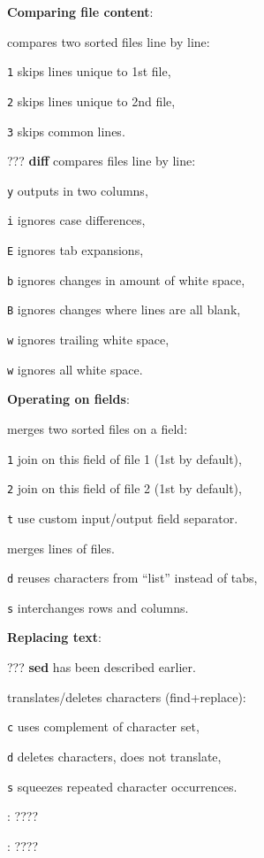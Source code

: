 \textbf{Comparing file content}:
\begin{compactenum}
	\item [\symbolcoreutils]  compares two sorted files line by line:
	\item [\texttt{1}] skips lines unique to 1st file,
	\item [\texttt{2}] skips lines unique to 2nd file,
	\item [\texttt{3}] skips common lines.

	\item [???] \textbf{diff} compares files line by line:
	\item [\texttt{y}] outputs in two columns,
	\item [\texttt{i}] ignores case differences,
	\item [\texttt{E}] ignores tab expansions,
	\item [\texttt{b}] ignores changes in amount of white space,
	\item [\texttt{B}] ignores changes where lines are all blank,
	\item [\texttt{w}] ignores trailing white space,
	\item [\texttt{w}] ignores all white space.
\end{compactenum}

\textbf{Operating on fields}:
\begin{compactenum}
	\item [\symbolcoreutils]  merges two sorted files on a field:
	\item [\texttt{1}] join on this field of file 1 (1st by default),
	\item [\texttt{2}] join on this field of file 2 (1st by default),
	\item [\texttt{t}] use custom input/output field separator.

	\item [\symbolcoreutils]  merges lines of files.
	\item [\texttt{d}] reuses characters from ``list'' instead of tabs,
	\item [\texttt{s}] interchanges rows and columns.
\end{compactenum}

\textbf{Replacing text}:
\begin{compactenum}
	\item [???] \textbf{sed} has been described earlier.

	\item [\symbolcoreutils]  translates/deletes characters (find+replace):
	\item [\texttt{c}] uses complement of character set,
	\item [\texttt{d}] deletes characters, does not translate,
	\item [\texttt{s}] squeezes repeated character occurrences.

	\item [\symbolcoreutils] : \dotfill ????

	\item [\symbolcoreutils] : \dotfill ????
\end{compactenum}

